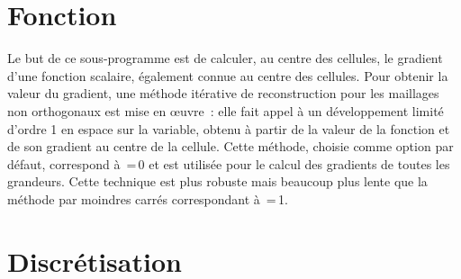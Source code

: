 
%
%
%
%


\label{ap:gradrc}

\vspace{1cm}
\section*{Fonction}

Le but de ce sous-programme est de calculer, au centre des cellules, le gradient
d'une fonction scalaire, \'egalement connue au centre des cellules.
Pour obtenir la valeur du gradient, une m\'ethode it\'erative de
reconstruction pour les maillages non orthogonaux est mise en
\oe uvre~: elle fait appel \`a un d\'eveloppement limit\'e d'ordre 1 en espace
sur la variable, obtenu \`a partir de la
valeur de la fonction et de son gradient au centre de la cellule. Cette
m\'ethode,
choisie comme option par d\'efaut, correspond \`a \,=\,0 et est utilis\'ee pour le calcul
des gradients de toutes les grandeurs. Cette technique est plus robuste mais beaucoup plus lente que la m\'ethode
 par moindres carr\'es correspondant \`a \,=\,1.

\section*{Discr\'etisation}

